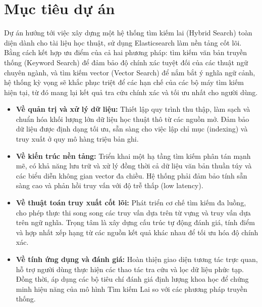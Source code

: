 \section{Mục tiêu dự án}
Dự án hướng tới việc xây dựng một hệ thống tìm kiếm lai (Hybrid Search) toàn diện dành cho tài liệu học thuật, sử dụng Elasticsearch làm nền tảng cốt lõi. Bằng cách kết hợp ưu điểm của cả hai phương pháp: tìm kiếm văn bản truyền thống (Keyword Search) để đảm bảo độ chính xác tuyệt đối của các thuật ngữ chuyên ngành, và tìm kiếm vector (Vector Search) để nắm bắt ý nghĩa ngữ cảnh, hệ thống kỳ vọng sẽ khắc phục triệt để các hạn chế của các bộ máy tìm kiếm hiện tại, từ đó mang lại kết quả tra cứu chính xác và tối ưu nhất cho người dùng.
\begin{itemize}
    \item \textbf{Về quản trị và xử lý dữ liệu:} Thiết lập quy trình thu thập, làm sạch và chuẩn hóa khối lượng lớn dữ liệu học thuật thô từ các nguồn mở. Đảm bảo dữ liệu được định dạng tối ưu, sẵn sàng cho việc lập chỉ mục (indexing) và truy xuất ở quy mô hàng triệu bản ghi.
    \item \textbf{Về kiến trúc nền tảng:} Triển khai một hạ tầng tìm kiếm phân tán mạnh mẽ, có khả năng lưu trữ và xử lý đồng thời cả dữ liệu văn bản thuần túy và các biểu diễn không gian vector đa chiều. Hệ thống phải đảm bảo tính sẵn sàng cao và phản hồi truy vấn với độ trễ thấp (low latency).
    \item \textbf{Về thuật toán truy xuất cốt lõi:} Phát triển cơ chế tìm kiếm đa luồng, cho phép thực thi song song các truy vấn dựa trên từ vựng và truy vấn dựa trên ngữ nghĩa. Trọng tâm là xây dựng cấu trúc tự động đánh giá, tính điểm và hợp nhất xếp hạng từ các nguồn kết quả khác nhau để tối ưu hóa độ chính xác.
    \item \textbf{Về tính ứng dụng và đánh giá:} Hoàn thiện giao diện tương tác trực quan, hỗ trợ người dùng thực hiện các thao tác tra cứu và lọc dữ liệu phức tạp. Đồng thời, áp dụng các bộ tiêu chí đánh giá định lượng khoa học để chứng minh hiệu năng của mô hình Tìm kiếm Lai so với các phương pháp truyền thống.
\end{itemize}
